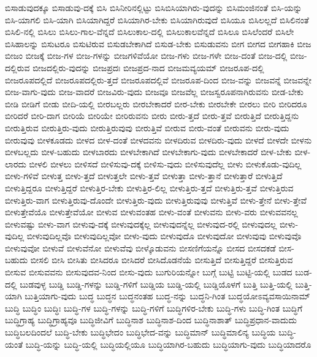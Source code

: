 {ಬಿಸಾಡುವುದಕ್ಕೂ
ಬಿಸಾಡುವು-ದಕ್ಕೆ
ಬಿಸಿ
ಬಿಸಿನೀರಿನಲ್ಲಿಟ್ಟು
ಬಿಸಿಬಿಸಿಯಾಗಿರು-ವುದನ್ನು
ಬಿಸಿಮಂಜಿನಂತೆ
ಬಿಸಿ-ಯನ್ನು
ಬಿಸಿ-ಯಾಗಲಿ
ಬಿಸಿ-ಯಾಗಿ
ಬಿಸಿಯಾಗಿದ್ದರೆ
ಬಿಸಿಯಾಗಿರ-ಬೇಕು
ಬಿಸಿಯಾಗಿರುವುದೆ
ಬಿಸಿಯೂ
ಬಿಸಿಲಲ್ಲದೆ
ಬಿಸಿಲಿನಂತೆ
ಬಿಸಿಲಿ-ನಲ್ಲಿ
ಬಿಸಿಲು
ಬಿಸಿಲು-ಗಾಲ-ವೆನ್ನದೆ
ಬಿಸಿಲುಕಾಲ-ದಲ್ಲಿ
ಬಿಸಿಲುಕಾಲವೆನ್ನದೆ
ಬಿಸಿಲೂ
ಬಿಸಿಲೆಂದರೆ
ಬಿಸಿಲೇ
ಬಿಸಿಹಾಲನ್ನು
ಬಿಸುಟರೂ
ಬಿಸುಟಿರುವ
ಬಿಸುಡಬೇಕಾಗಿದೆ
ಬಿಸುಡ-ಬೇಕು
ಬಿಸುಡುವನು
ಬೀಗ
ಬೀಗದ
ಬೀಗಹಾಕಿ
ಬೀಜ
ಬೀಜಂ
ಬೀಜಕ್ಕೆ
ಬೀಜ-ಗಳ
ಬೀಜ-ಗಳನ್ನು
ಬೀಜಗಳಿವೆಯೋ
ಬೀಜ-ಗಳು
ಬೀಜ-ಗಳೇ
ಬೀಜ-ದಂತೆ
ಬೀಜ-ದಲ್ಲಿ
ಬೀಜ-ದಲ್ಲಿರುವ
ಬೀಜದಲ್ಲಿರು-ವುದನ್ನು
ಬೀಜಪ್ರದಃ
ಬೀಜಪ್ರದ-ನಾದ
ಬೀಜಮವ್ಯಯಮ್
ಬೀಜರೂಪ-ದಲ್ಲಿ
ಬೀಜರೂಪದಲ್ಲಿದೆ
ಬೀಜರೂಪದಲ್ಲಿರು-ತ್ತದೆ
ಬೀಜರೂಪದಲ್ಲಿವೆ
ಬೀಜರೂಪ-ದಿಂದ
ಬೀಜ-ವನ್ನು
ಬೀಜವನ್ನೆ
ಬೀಜವನ್ನೇ
ಬೀಜ-ವಾಗು-ವುದು
ಬೀಜ-ವಾದರೆ
ಬೀಜವಿರು-ವುದು
ಬೀಜವೂ
ಬೀಜವೆಲ್ಲ
ಬೀಜಸ್ವರೂಪನಾಗಿರುವನು
ಬೀಡ-ಬೇಕು
ಬೀಡಿ
ಬೀಡಿಗೆ
ಬೀಡು
ಬೀದಿ-ಯಲ್ಲಿ
ಬೀರಬಲ್ಲರು
ಬೀರಬೇಕಾದರೆ
ಬೀರ-ಬೇಕು
ಬೀರಬೇಕೇ
ಬೀರಲು
ಬೀರಿ
ಬೀರಿದರೂ
ಬೀರಿದರೆ
ಬೀರಿ-ದಾಗ
ಬೀರಿಯೆ
ಬೀರಿಯೇ
ಬೀರಿರುವನು
ಬೀರು
ಬೀರು-ತ್ತದೆ
ಬೀರು-ತ್ತವೆ
ಬೀರುತ್ತಿದೆ
ಬೀರುತ್ತಿದ್ದನು
ಬೀರುತ್ತಿರುವ
ಬೀರುತ್ತಿರು-ವುದು
ಬೀರುತ್ತಿರುವುವು
ಬೀರುತ್ತಿವೆ
ಬೀರುವ
ಬೀರು-ವಂತೆ
ಬೀರುವನು
ಬೀರು-ವುದು
ಬೀರುವುವು
ಬೀಳಕೂಡದು
ಬೀಳದ
ಬೀಳ-ದಂತೆ
ಬೀಳದವನು
ಬೀಳದಿರುವ
ಬೀಳದಿರು-ವುದು
ಬೀಳದೆ
ಬೀಳದೇ
ಬೀಳನು
ಬೀಳಬಲ್ಲದು
ಬೀಳ-ಬಹುದು
ಬೀಳಬಾರದು
ಬೀಳಬೇಕಾಗಿದೆ
ಬೀಳಬೇಕಾಗು-ವುದು
ಬೀಳಬೇಕಾದರೆ
ಬೀಳ-ಬೇಕು
ಬೀಳ-ಲಾರದು
ಬೀಳಲಿ
ಬೀಳಲು
ಬೀಳಿಸದೆ
ಬೀಳಿಸುವು-ದಕ್ಕೆ
ಬೀಳಿಸು-ವುದು
ಬೀಳಿಸುವುದೆಲ್ಲ
ಬೀಳು
ಬೀಳುಕೊಡು-ವುದಿಲ್ಲ
ಬೀಳು-ಗಳಿವೆ
ಬೀಳುತ್ತ
ಬೀಳು-ತ್ತದೆ
ಬೀಳುತ್ತಲೇ
ಬೀಳು-ತ್ತವೆ
ಬೀಳುತ್ತಾ
ಬೀಳು-ತ್ತಾನೆ
ಬೀಳುತ್ತಾರೆ
ಬೀಳುತ್ತಿದೆ
ಬೀಳುತ್ತಿದ್ದರೂ
ಬೀಳುತ್ತಿದ್ದರೆ
ಬೀಳುತ್ತಿರ-ಬೇಕು
ಬೀಳುತ್ತಿರ-ಲಿಲ್ಲ
ಬೀಳುತ್ತಿರು-ತ್ತದೆ
ಬೀಳುತ್ತಿರು-ತ್ತವೆ
ಬೀಳುತ್ತಿರುವ
ಬೀಳುತ್ತಿರು-ವಾಗ
ಬೀಳುತ್ತಿರುವು-ದೊಂದೇ
ಬೀಳುತ್ತಿರು-ವುದು
ಬೀಳುತ್ತಿರುವುವು
ಬೀಳುತ್ತಿವೆ
ಬೀಳು-ತ್ತೇನೆ
ಬೀಳು-ತ್ತೇವೆ
ಬೀಳುತ್ತೇವೆಯೊ
ಬೀಳುತ್ತೇವೆಯೋ
ಬೀಳುವ
ಬೀಳುವಂತಹ
ಬೀಳು-ವಂತೆ
ಬೀಳುವನು
ಬೀಳು-ವರು
ಬೀಳುವವನಲ್ಲ
ಬೀಳುವಷ್ಟು
ಬೀಳು-ವಾಗ
ಬೀಳುವು-ದಕ್ಕೆ
ಬೀಳುವುದಕ್ಕೆಲ್ಲ
ಬೀಳುವುದನ್ನೆಲ್ಲ
ಬೀಳುವುದ-ರಲ್ಲಿ
ಬೀಳುವುದಲ್ಲ
ಬೀಳು-ವುದಿಲ್ಲ
ಬೀಳುವುದಿಲ್ಲವೊ
ಬೀಳುವುದಿಲ್ಲವೋ
ಬೀಳು-ವುದು
ಬೀಳುವುದೊ
ಬೀಳುವುದೋ
ಬೀಳುವುವು
ಬೀಳುವುವೊ
ಬೀಳುವುವೋ
ಬೀಳುವೆ
ಬೀಳುವೆನೋ
ಬೀಳುವೆವು
ಬೀಳ್ಕೊಡುವನು
ಬೀಸಣಿಗೆಯನ್ನೊ
ಬೀಸದ
ಬೀಸದಕಡೆ
ಬೀಸ-ಬಹುದು
ಬೀಸಲಿ
ಬೀಸಿ
ಬೀಸಿತು
ಬೀಸಿದರೂ
ಬೀಸಿದರೆ
ಬೀಸಿದೊಡನೆಯೆ
ಬೀಸುತ್ತಿದೆ
ಬೀಸುತ್ತಿದ್ದರೆ
ಬೀಸುತ್ತಿರುವ
ಬೀಸುವ
ಬೀಸುವವನು
ಬೀಸುವುದವ-ನಿಂದ
ಬೀಸು-ವುದು
ಬುಗುರಿಯನ್ನೋ
ಬುಗ್ಗೆ
ಬುಟ್ಟಿ
ಬುಟ್ಟಿ-ಯಲ್ಲಿ
ಬುಡದ
ಬುಡ-ದಲ್ಲಿ
ಬುಡವುಳ್ಳ
ಬುಡ್ಡಿ
ಬುಡ್ಡಿ-ಗಳನ್ನು
ಬುಡ್ಡಿ-ಗಳಿಗೆ
ಬುಡ್ಡಿಯ
ಬುಡ್ಡಿ-ಯಲ್ಲಿ
ಬುಡ್ಡಿಯೊಳಗೆ
ಬುತ್ತಿ
ಬುತ್ತಿ-ಯಲ್ಲಿ
ಬುತ್ತಿ-ಯಾಗಿ
ಬುತ್ತಿಯಾಗು-ವುದು
ಬುದ್ಧ
ಬುದ್ಧನ
ಬುದ್ಧನಂತಹ
ಬುದ್ಧ-ನನ್ನು
ಬುದ್ಧನಿ-ಗಿಂತ
ಬುದ್ಧಯೋಽವ್ಯವಸಾಯಿನಾಮ್
ಬುದ್ಧಿ
ಬುದ್ಧಿಂ
ಬುದ್ಧಿಃ
ಬುದ್ಧಿ-ಗಳ
ಬುದ್ಧಿ-ಗಳನ್ನು
ಬುದ್ಧಿ-ಗಳಿಗೆ
ಬುದ್ಧಿಗಳಿರ-ಬೇಕು
ಬುದ್ಧಿ-ಗಳು
ಬುದ್ಧಿ-ಗಿಂತ
ಬುದ್ಧಿಗೆ
ಬುದ್ಧಿಗ್ರಾಹ್ಯ
ಬುದ್ಧಿಗ್ರಾಹ್ಯವೂ
ಬುದ್ಧಿಜೀವಿಗೆ
ಬುದ್ಧಿನಾಶ
ಬುದ್ಧಿನಾಶ-ದಿಂದ
ಬುದ್ಧಿನಾಶಾತ್
ಬುದ್ಧಿಪ್ರಧಾನ-ವಾದುದು
ಬುದ್ಧಿಬಲದಿಂದಲೆ
ಬುದ್ಧಿ-ಬೇಕು
ಬುದ್ಧಿಭೇದಂ
ಬುದ್ಧಿಭೇದ-ವನ್ನು
ಬುದ್ಧಿಮಾನ್
ಬುದ್ಧಿಮಾಲಿನ್ಯ
ಬುದ್ಧಿಯ
ಬುದ್ಧಿ-ಯಂತೆ
ಬುದ್ಧಿ-ಯನ್ನು
ಬುದ್ಧಿ-ಯಲ್ಲಿ
ಬುದ್ಧಿಯಲ್ಲಿಯೂ
ಬುದ್ಧಿಯಾಗಿರ-ಬಹುದು
ಬುದ್ಧಿಯಾಗು-ವುದು
ಬುದ್ಧಿಯಾದರೊ
}
